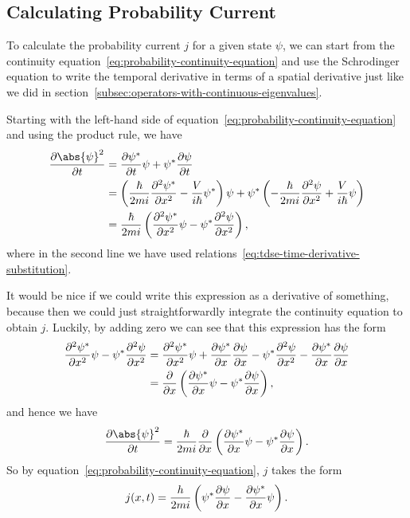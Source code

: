 \documentclass[../quantum_mechanics.tex]{subfiles}
\begin{document}
        \subsection{Calculating Probability Current}\label{subsec:calculating-probability-current}
            To calculate the probability current $j$ for a given state $\psi$, we can start from the continuity equation~\ref{eq:probability-continuity-equation} and use the Schrodinger equation to write the temporal derivative in terms of a spatial derivative just like we did in section~\ref{subsec:operators-with-continuous-eigenvalues}.

            Starting with the left-hand side of equation~\ref{eq:probability-continuity-equation} and using the product rule, we have
            \begin{align}
                \pdv{\abs{\psi}^2}{t}&=\pdv{\psi^\ast}{t}\psi+\psi^\ast\pdv{\psi}{t}\\
                &=\left(\frac{\hbar}{2mi}\pdv[2]{\psi^\ast}{x}-\frac{V}{i\hbar}\psi^\ast\right)\psi+\psi^\ast\left(-\frac{\hbar}{2mi}\pdv[2]{\psi}{x}+\frac{V}{i\hbar}\psi\right)\\
                &=\frac{\hbar}{2mi}\left(\pdv[2]{\psi^\ast}{x}\psi-\psi^\ast\pdv[2]{\psi}{x}\right),
            \end{align}
            where in the second line we have used relations~\ref{eq:tdse-time-derivative-substitution}.

            It would be nice if we could write this expression as a derivative of something, because then we could just straightforwardly integrate the continuity equation to obtain $j$.
            Luckily, by adding zero we can see that this expression has the form
            \begin{align}
                \pdv[2]{\psi^\ast}{x}\psi-\psi^\ast\pdv[2]{\psi}{x}&=\pdv[2]{\psi^\ast}{x}\psi+\pdv{\psi^\ast}{x}\pdv{\psi}{x}-\psi^\ast\pdv[2]{\psi}{x}-\pdv{\psi^\ast}{x}\pdv{\psi}{x}\\
                &=\pdv{}{x}\left(\pdv{\psi^\ast}{x}\psi-\psi^\ast\pdv{\psi}{x}\right),
            \end{align}
            and hence we have
            \begin{equation}
                \pdv{\abs{\psi}^2}{t}=\frac{\hbar}{2mi}\pdv{}{x}\left(\pdv{\psi^\ast}{x}\psi-\psi^\ast\pdv{\psi}{x}\right).
            \end{equation}
            So by equation~\ref{eq:probability-continuity-equation}, $j$ takes the form
            \begin{equation}
                j(x,t)=\frac{h}{2mi}\left(\psi^\ast\pdv{\psi}{x}-\pdv{\psi^\ast}{x}\psi\right).
            \end{equation}

\end{document}
